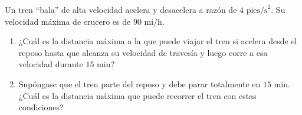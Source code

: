 \item Un tren ``bala'' de alta velocidad acelera y desacelera a razón de $4 \text{ pies/s}^2$. Su velocidad máxima de crucero es de $90 \text{ mi/h}$.
\begin{enumerate}
    \item[(a)] ¿Cuál es la distancia máxima a la que puede viajar el tren si acelera desde el reposo hasta que alcanza su velocidad de travesía y luego corre a esa velocidad durante $15 \text{ min}$?
    \item[(b)] Supóngase que el tren parte del reposo y debe parar totalmente en $15 \text{ min}$. ¿Cuál es la distancia máxima que puede recorrer el tren con estas condiciones?
\end{enumerate}
